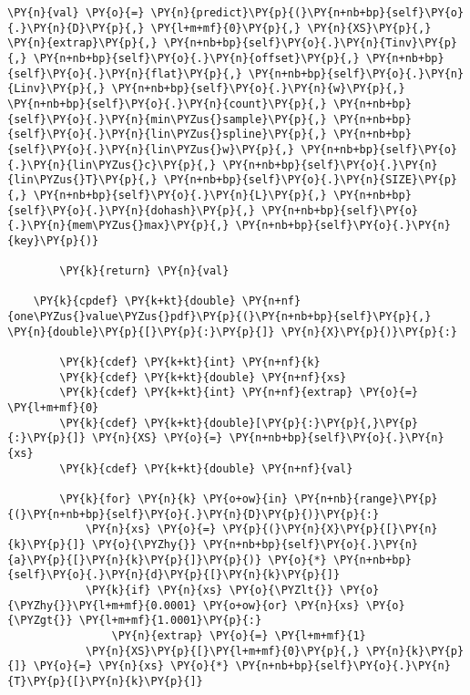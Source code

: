 \begin{Verbatim}[commandchars=\\\{\}]
        \PY{n}{val} \PY{o}{=} \PY{n}{predict}\PY{p}{(}\PY{n+nb+bp}{self}\PY{o}{.}\PY{n}{D}\PY{p}{,} \PY{l+m+mf}{0}\PY{p}{,} \PY{n}{XS}\PY{p}{,} \PY{n}{extrap}\PY{p}{,} \PY{n+nb+bp}{self}\PY{o}{.}\PY{n}{Tinv}\PY{p}{,} \PY{n+nb+bp}{self}\PY{o}{.}\PY{n}{offset}\PY{p}{,} \PY{n+nb+bp}{self}\PY{o}{.}\PY{n}{flat}\PY{p}{,} \PY{n+nb+bp}{self}\PY{o}{.}\PY{n}{Linv}\PY{p}{,} \PY{n+nb+bp}{self}\PY{o}{.}\PY{n}{w}\PY{p}{,} \PY{n+nb+bp}{self}\PY{o}{.}\PY{n}{count}\PY{p}{,} \PY{n+nb+bp}{self}\PY{o}{.}\PY{n}{min\PYZus{}sample}\PY{p}{,} \PY{n+nb+bp}{self}\PY{o}{.}\PY{n}{lin\PYZus{}spline}\PY{p}{,} \PY{n+nb+bp}{self}\PY{o}{.}\PY{n}{lin\PYZus{}w}\PY{p}{,} \PY{n+nb+bp}{self}\PY{o}{.}\PY{n}{lin\PYZus{}c}\PY{p}{,} \PY{n+nb+bp}{self}\PY{o}{.}\PY{n}{lin\PYZus{}T}\PY{p}{,} \PY{n+nb+bp}{self}\PY{o}{.}\PY{n}{SIZE}\PY{p}{,} \PY{n+nb+bp}{self}\PY{o}{.}\PY{n}{L}\PY{p}{,} \PY{n+nb+bp}{self}\PY{o}{.}\PY{n}{dohash}\PY{p}{,} \PY{n+nb+bp}{self}\PY{o}{.}\PY{n}{mem\PYZus{}max}\PY{p}{,} \PY{n+nb+bp}{self}\PY{o}{.}\PY{n}{key}\PY{p}{)}
   
        \PY{k}{return} \PY{n}{val}

    \PY{k}{cpdef} \PY{k+kt}{double} \PY{n+nf}{one\PYZus{}value\PYZus{}pdf}\PY{p}{(}\PY{n+nb+bp}{self}\PY{p}{,} \PY{n}{double}\PY{p}{[}\PY{p}{:}\PY{p}{]} \PY{n}{X}\PY{p}{)}\PY{p}{:}
        
        \PY{k}{cdef} \PY{k+kt}{int} \PY{n+nf}{k}
        \PY{k}{cdef} \PY{k+kt}{double} \PY{n+nf}{xs}
        \PY{k}{cdef} \PY{k+kt}{int} \PY{n+nf}{extrap} \PY{o}{=} \PY{l+m+mf}{0}
        \PY{k}{cdef} \PY{k+kt}{double}[\PY{p}{:}\PY{p}{,}\PY{p}{:}\PY{p}{]} \PY{n}{XS} \PY{o}{=} \PY{n+nb+bp}{self}\PY{o}{.}\PY{n}{xs}
        \PY{k}{cdef} \PY{k+kt}{double} \PY{n+nf}{val}

        \PY{k}{for} \PY{n}{k} \PY{o+ow}{in} \PY{n+nb}{range}\PY{p}{(}\PY{n+nb+bp}{self}\PY{o}{.}\PY{n}{D}\PY{p}{)}\PY{p}{:}
            \PY{n}{xs} \PY{o}{=} \PY{p}{(}\PY{n}{X}\PY{p}{[}\PY{n}{k}\PY{p}{]} \PY{o}{\PYZhy{}} \PY{n+nb+bp}{self}\PY{o}{.}\PY{n}{a}\PY{p}{[}\PY{n}{k}\PY{p}{]}\PY{p}{)} \PY{o}{*} \PY{n+nb+bp}{self}\PY{o}{.}\PY{n}{d}\PY{p}{[}\PY{n}{k}\PY{p}{]} 
            \PY{k}{if} \PY{n}{xs} \PY{o}{\PYZlt{}} \PY{o}{\PYZhy{}}\PY{l+m+mf}{0.0001} \PY{o+ow}{or} \PY{n}{xs} \PY{o}{\PYZgt{}} \PY{l+m+mf}{1.0001}\PY{p}{:}
                \PY{n}{extrap} \PY{o}{=} \PY{l+m+mf}{1}
            \PY{n}{XS}\PY{p}{[}\PY{l+m+mf}{0}\PY{p}{,} \PY{n}{k}\PY{p}{]} \PY{o}{=} \PY{n}{xs} \PY{o}{*} \PY{n+nb+bp}{self}\PY{o}{.}\PY{n}{T}\PY{p}{[}\PY{n}{k}\PY{p}{]}


\end{Verbatim}
